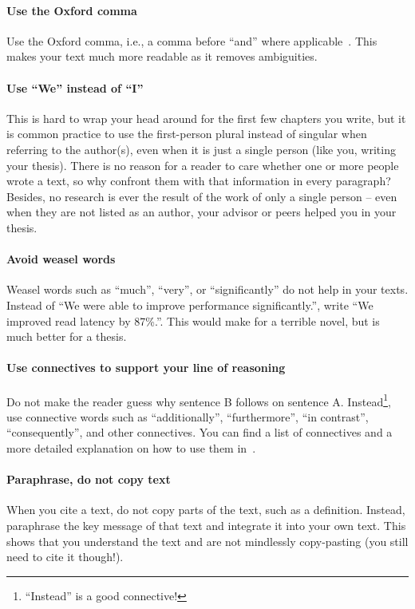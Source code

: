 \documentclass[a4paper]{article}
\begin{document}
\paragraph{Use the Oxford comma}
Use the Oxford comma, i.e., a comma before ``and'' where applicable~\cite{oxfordcomma}.
This makes your text much more readable as it removes ambiguities.

\paragraph{Use ``We'' instead of ``I''}
This is hard to wrap your head around for the first few chapters you write, but it is common practice to use the first-person plural instead of singular when referring to the author(s), even when it is just a single person (like you, writing your thesis).
There is no reason for a reader to care whether one or more people wrote a text, so why confront them with that information in every paragraph?
Besides, no research is ever the result of the work of only a single person -- even when they are not listed as an author, your advisor or peers helped you in your thesis.

\paragraph{Avoid weasel words}
Weasel words such as ``much'', ``very'', or ``significantly'' do not help in your texts.
Instead of ``We were able to improve performance significantly.'', write ``We improved read latency by 87\%.''.
This would make for a terrible novel, but is much better for a thesis.

\paragraph{Use connectives to support your line of reasoning}
Do not make the reader guess why sentence B follows on sentence A.
Instead\footnote{``Instead'' is a good connective!}, use connective words such as ``additionally'', ``furthermore'', ``in contrast'', ``consequently'', and other connectives.
You can find a list of connectives and a more detailed explanation on how to use them in~\cite{connectives}.

\paragraph{Paraphrase, do not copy text}
When you cite a text, do not copy parts of the text, such as a definition.
Instead, paraphrase the key message of that text and integrate it into your own text.
This shows that you understand the text and are not mindlessly copy-pasting (you still need to cite it though!).
\end{document}
